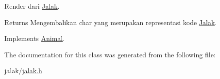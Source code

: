 Render dari \hyperlink{classJalak}{Jalak}. 

\begin{DoxyReturn}{Returns}
Mengembalikan char yang merupakan representasi kode \hyperlink{classJalak}{Jalak}. 
\end{DoxyReturn}


Implements \hyperlink{classAnimal_a43a47c0f41d211128e04abc6add53def}{Animal}.



The documentation for this class was generated from the following file\+:\begin{DoxyCompactItemize}
\item 
jalak/\hyperlink{jalak_8h}{jalak.\+h}\end{DoxyCompactItemize}
